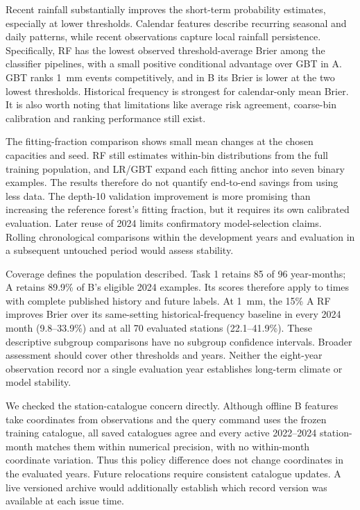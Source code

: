\documentclass[11pt,a4paper]{article}
\begin{document}
Recent rainfall substantially improves the short-term probability estimates, especially at lower thresholds. Calendar features describe recurring seasonal and daily patterns, while recent observations capture local rainfall persistence. Specifically, RF has the lowest observed threshold-average Brier among the classifier pipelines, with a small positive conditional advantage over GBT in A. GBT ranks 1~mm events competitively, and in B its Brier is lower at the two lowest thresholds. Historical frequency is strongest for calendar-only mean Brier. It is also worth noting that limitations like average risk agreement, coarse-bin calibration and ranking performance still exist.

The fitting-fraction comparison shows small mean changes at the chosen capacities and seed. RF still estimates within-bin distributions from the full training population, and LR/GBT expand each fitting anchor into seven binary examples. The results therefore do not quantify end-to-end savings from using less data. The depth-10 validation improvement is more promising than increasing the reference forest's fitting fraction, but it requires its own calibrated evaluation. Later reuse of 2024 limits confirmatory model-selection claims. Rolling chronological comparisons within the development years and evaluation in a subsequent untouched period would assess stability.

Coverage defines the population described. Task 1 retains 85 of 96 year-months; A retains 89.9\% of B's eligible 2024 examples. Its scores therefore apply to times with complete published history and future labels. At 1~mm, the 15\% A RF improves Brier over its same-setting historical-frequency baseline in every 2024 month (9.8--33.9\%) and at all 70 evaluated stations (22.1--41.9\%). These descriptive subgroup comparisons have no subgroup confidence intervals. Broader assessment should cover other thresholds and years. Neither the eight-year observation record nor a single evaluation year establishes long-term climate or model stability.

We checked the station-catalogue concern directly. Although offline B features take coordinates from observations and the query command uses the frozen training catalogue, all saved catalogues agree and every active 2022--2024 station-month matches them within numerical precision, with no within-month coordinate variation. Thus this policy difference does not change coordinates in the evaluated years. Future relocations require consistent catalogue updates. A live versioned archive would additionally establish which record version was available at each issue time.
\end{document}
